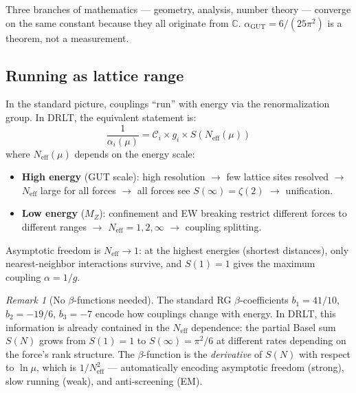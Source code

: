 \documentclass[12pt]{article}
\theoremstyle{remark}
\newtheorem{remark}[theorem]{Remark}
\theoremstyle{definition}
\newcommand{\CC}{\mathbb{C}}
\begin{document}
Three branches of mathematics --- geometry, analysis, number theory --- converge on the same constant because they all originate from $\CC$. $\alpha_\text{GUT} = 6/(25\pi^2)$ is a theorem, not a measurement.

\subsection{Running as lattice range}

In the standard picture, couplings ``run'' with energy via the renormalization group. In DRLT, the equivalent statement is:
\begin{equation}
\frac{1}{\alpha_i(\mu)} = \mathcal{C}_i \times g_i \times S\!\left(N_\text{eff}(\mu)\right)
\end{equation}
where $N_\text{eff}(\mu)$ depends on the energy scale:

\begin{itemize}
\item \textbf{High energy} (GUT scale): high resolution $\to$ few lattice sites resolved $\to$ $N_\text{eff}$ large for all forces $\to$ all forces see $S(\infty) = \zeta(2)$ $\to$ unification.
\item \textbf{Low energy} ($M_Z$): confinement and EW breaking restrict different forces to different ranges $\to$ $N_\text{eff} = 1, 2, \infty$ $\to$ coupling splitting.
\end{itemize}

Asymptotic freedom is $N_\text{eff} \to 1$: at the highest energies (shortest distances), only nearest-neighbor interactions survive, and $S(1) = 1$ gives the maximum coupling $\alpha = 1/g$.

\begin{remark}[No $\beta$-functions needed]
The standard RG $\beta$-coefficients $b_1 = 41/10$, $b_2 = -19/6$, $b_3 = -7$ encode how couplings change with energy. In DRLT, this information is already contained in the $N_\text{eff}$ dependence: the partial Basel sum $S(N)$ grows from $S(1) = 1$ to $S(\infty) = \pi^2/6$ at different rates depending on the force's rank structure. The $\beta$-function is the \emph{derivative} of $S(N)$ with respect to $\ln\mu$, which is $1/N_\text{eff}^2$ --- automatically encoding asymptotic freedom (strong), slow running (weak), and anti-screening (EM).
\end{remark}
\end{document}
